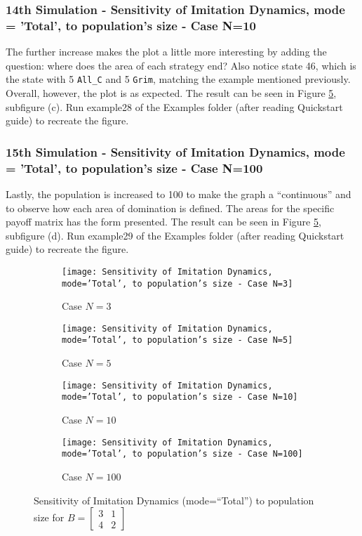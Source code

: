 \subsubsection{14th Simulation - Sensitivity of Imitation Dynamics, mode = 'Total', to population's size - Case N=10}
The further increase makes the plot a little more interesting by adding the question: where does the area of each strategy end? Also notice state 46, which is the state with 5 \texttt{All\_C} and 5 \texttt{Grim}, matching the example mentioned previously. Overall, however, the plot is as expected. The result can be seen in Figure \ref{fig:Sensitivity of Imitation Dynamics, mode='Total', to population's size}, subfigure (c). Run example28 of the Examples folder (after reading Quickstart guide) to recreate the figure.

\subsubsection{15th Simulation - Sensitivity of Imitation Dynamics, mode = 'Total', to population's size - Case N=100}
Lastly, the population is increased to 100 to make the graph a ``continuous'' and to observe how each area of domination is defined. The areas for the specific payoff matrix has the form presented. The result can be seen in Figure \ref{fig:Sensitivity of Imitation Dynamics, mode='Total', to population's size}, subfigure (d). Run example29 of the Examples folder (after reading Quickstart guide) to recreate the figure.

	\begin{figure}[h]
		\centering
		\begin{subfigure}[t]{.49\textwidth}
			\centering
			\texttt{[image: Sensitivity of Imitation Dynamics, mode='Total', to population's size - Case N=3]}
			\caption{Case $N=3$}
			\label{fig:example26}
		\end{subfigure}
		\begin{subfigure}[t]{.49\textwidth}
			\centering
			\texttt{[image: Sensitivity of Imitation Dynamics, mode='Total', to population's size - Case N=5]}
			\caption{Case $N=5$}
			\label{fig:example27}
		\end{subfigure}
		\begin{subfigure}[t]{.49\textwidth}
			\centering
			\texttt{[image: Sensitivity of Imitation Dynamics, mode='Total', to population's size - Case N=10]}
			\caption{Case $N=10$}
			\label{fig:example28}
		\end{subfigure}
		\begin{subfigure}[t]{.49\textwidth}
			\centering
			\texttt{[image: Sensitivity of Imitation Dynamics, mode='Total', to population's size - Case N=100]}
			\caption{Case $N=100$}
			\label{fig:example29}
		\end{subfigure}
		\caption{Sensitivity of Imitation Dynamics (mode=``Total'') to population size for $B = \begin{bmatrix} 3 & 1 \\ 4 & 2 \end{bmatrix}$}
		\label{fig:Sensitivity of Imitation Dynamics, mode='Total', to population's size}
	\end{figure}

